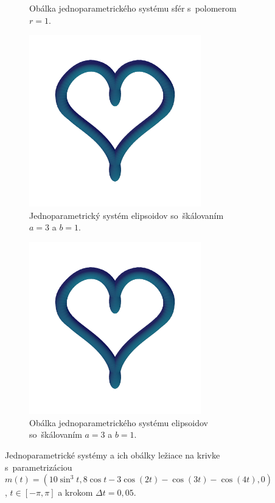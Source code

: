 \documentclass[12pt, twoside]{book}
\begin{document}
\begin{figure}[h]
\begin{subfigure}[t]{0.49\textwidth}
        	\caption{Obálka jednoparametrického systému sfér s~polomerom $r=1$.}
        \label{fig:plocha12}
    \end{subfigure}
    \hfill
    \begin{subfigure}[t]{0.49\textwidth}
        \centering
        \includegraphics[width=0.82\textwidth, trim=0mm 80mm 0mm 50mm, clip=true]{images/heart_ellipsoids.png}
        	\caption{Jednoparametrický systém elipsoidov so~škálovaním $a=3$ a $b=1$.}
        \label{fig:plocha13}
    \end{subfigure}
    \hfill
    \begin{subfigure}[t]{0.49\textwidth}
        \centering
        \includegraphics[width=0.82\textwidth, trim=0mm 80mm 0mm 50mm, clip=true]{images/heart_ellipsoids_envelope.png}
        	\caption{Obálka jednoparametrického systému elipsoidov so~škálovaním $a=3$ a $b=1$.}
        \label{fig:plocha14}
    \end{subfigure}
    \caption[Jednoparametrické systémy a ich obálky ležiace na krivke srdce.]{Jednoparametrické systémy a ich obálky ležiace na krivke s~parametrizáciou $m(t)=(10\sin^{3}t, 8 \cos t-3\cos(2t) -\cos(3t)-\cos (4t), 0)$, $t \in [-\pi, \pi]$ a krokom $\Delta t = 0,05.$}
    \label{fig:katalogIII}
\end{figure}
\end{document}
